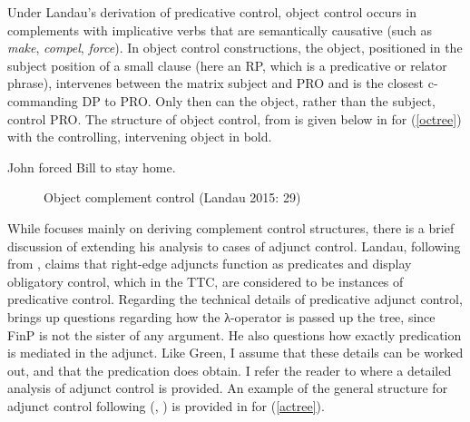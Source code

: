 \documentclass[output=paper,colorlinks,citecolor=brown]{langscibook}
\begin{document}
\largerpage
Under Landau’s derivation of predicative control, object control occurs in complements with implicative verbs that are semantically causative (such as \textit{make}, \textit{compel}, \textit{force}). In object control constructions, the object, positioned in the subject position of a small clause (here an RP, which is a predicative or relator phrase), intervenes between the matrix subject and PRO and is the closest c-commanding DP to PRO. Only then can the object, rather than the subject, control PRO. The structure of object control, from \citet[29]{landau2015} is given below in  for (\ref{octree}) with the controlling, intervening object in bold.

\ea \label{octree} John forced Bill to stay home. 
\z

\begin{figure}
\caption{Object complement control (Landau 2015: 29)}
\label{fig:octree}
\end{figure}


While \citet{landau2015} focuses mainly on deriving complement control structures, there is a brief discussion of extending his analysis to cases of adjunct control. Landau, following from \citet{williams1992}, claims that right-edge adjuncts function as predicates and display obligatory control, which in the TTC, are considered to be instances of predicative control. Regarding the technical details of predicative adjunct control, \citet{green2018adjunct} brings up questions regarding how the λ-operator is passed up the tree, since FinP is not the sister of any argument. He also questions how exactly predication is mediated in the adjunct. Like Green, I assume that these details can be worked out, and that the predication does obtain. I  refer the reader to \citet{landa2021} where a detailed analysis of adjunct control is provided. An example of the general structure for adjunct control following \citeauthor{landau2015} (\citeyear{landau2015}, \citeyear{landau2017}) is provided in  for (\ref{actree}).
\end{document}
